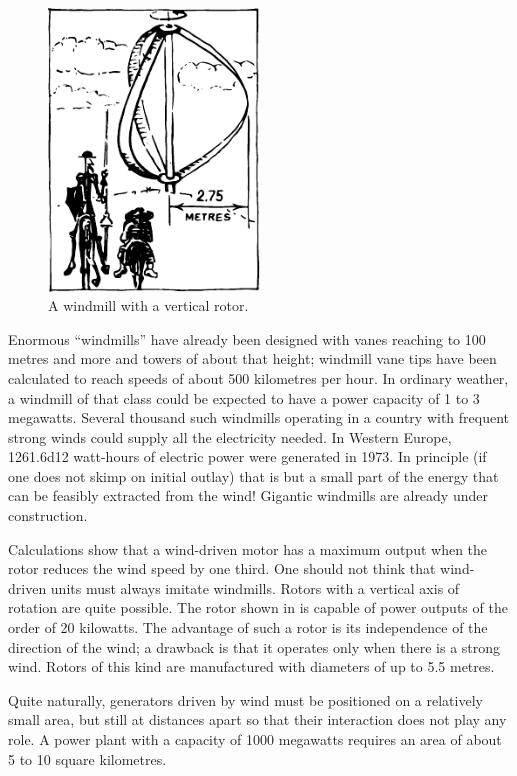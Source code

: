 \begin{figure}[!ht]
\centering
\includegraphics[width=0.5\textwidth]{figures/fig-06-06.pdf}
\caption{A windmill with a vertical rotor.}
\label{fig-6.6}
\end{figure}
Enormous ``windmills'' have already been designed with vanes reaching to 100 metres and more and towers of about that height; windmill vane tips have been calculat­ed to reach speeds of about 500 kilometres per hour. In ordinary weather, a windmill of that class could be expected to have a power capacity of 1 to 3 megawatts. Several thousand such windmills operating in a country with frequent strong winds could supply all the electric­ity needed. In Western Europe, \num{1261.6d12} watt-hours of electric power were generated in 1973. In principle (if one does not skimp on initial outlay) that is but a small part of the energy that can be feasibly extracted from the wind! Gigantic windmills are already under con­struction.


Calculations show that a wind-driven motor has a maximum output when the rotor reduces the wind speed by one third. One should not think that wind-driven units must always imitate windmills. Rotors with a vertical axis of rotation are quite possible. The rotor shown in  is capable of power outputs of the order of 20 kilowatts. The advantage of such a rotor is its inde­pendence of the direction of the wind; a drawback is that it operates only when there is a strong wind. Rotors of this kind are manufactured with diameters of up to 5.5 metres.

Quite naturally, generators driven by wind must be positioned on a relatively small area, but still at dis­tances apart so that their interaction does not play any role. A power plant with a capacity of 1000 megawatts requires an area of about 5 to 10 square kilometres.


